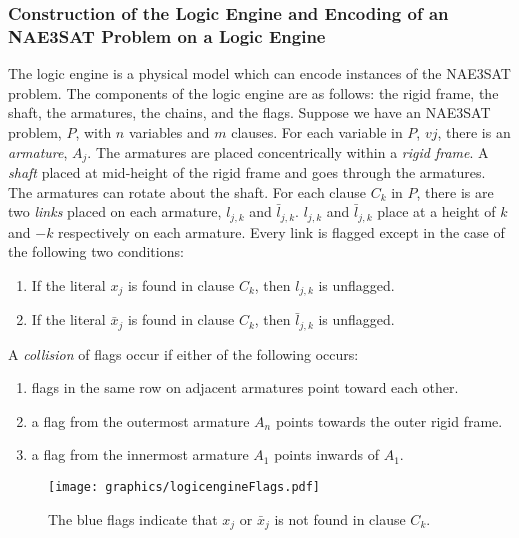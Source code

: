 \subsubsection{Construction of the Logic Engine and Encoding of an NAE3SAT Problem on a Logic 
Engine}
The logic engine is a physical model which can encode instances of the NAE3SAT problem.  The 
components of the logic engine are as follows: the rigid frame, the shaft, the armatures,
the chains, and the flags.  Suppose we have an NAE3SAT problem, $P$, with $n$ variables and $m$ 
clauses.  For each variable in $P$, $vj$, there is an \textit{armature}, $A_j$.  The armatures are 
placed concentrically within a \textit{rigid frame}.  A \textit{shaft} placed at mid-height of the 
rigid frame and goes through the armatures.  The armatures can rotate about the shaft.  For each 
clause $C_k$ in $P$, there is are two \textit{links} placed on each armature, $l_{j,k}$ and 
$\bar{l}_{j,k}$. $l_{j,k}$ and $\bar{l}_{j,k}$ place at a height of $k$ and $-k$ respectively on  
each armature.  Every link is flagged except in the case of the following two conditions:
\begin{enumerate}
 \item If the literal $x_j$ is found in clause $C_k$, then $l_{j,k}$ is unflagged.
 \item If the literal $\bar{x}_j$ is found in clause $C_k$, then $\bar{l}_{j,k}$ is unflagged.
\end{enumerate}
A \textit{collision} of flags occur if either of the following occurs:
\begin{enumerate}
\item flags in the same row on adjacent armatures point toward each other.
\item a flag from the outermost armature $A_n$ points towards the outer rigid frame.
\item a flag from the innermost armature $A_1$ points inwards of $A_1$.
\end{enumerate}
\begin{figure}[!htbp]
\begin{center}
\texttt{[image: graphics/logicengineFlags.pdf]}
\caption{The blue flags indicate that $x_j$ or $\bar{x}_j$ is not found in clause $C_k$. 
}\label{fig:logicengine-1}
\end{center}
\end{figure}

